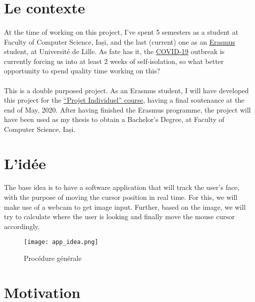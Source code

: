 \section{Le contexte}
\paragraph{}
At the time of working on this project, I've spent 5 semesters as a student at Faculty of Computer Science, Iași, and the last (current) one as an \href{https://ec.europa.eu/programmes/erasmus-plus/about_en}{Erasmus} student, at Université de Lille.
As fate has it, the \href{https://en.wikipedia.org/wiki/2019–20_coronavirus_pandemic}{COVID-19} outbreak is currently forcing us into at least 2 weeks of self-isolation, so what better opportunity to spend quality time working on this?
\paragraph{}
This is a double purposed project.
As an Erasmus student, I will have developed this project for the \href{https://www.fil.univ-lille1.fr/portail/index.php?dipl=MInfo&sem=S8&ue=PJI&label=Présentation}{``Projet Individuel'' course}, having a final soutenance at the end of May, 2020.
After having finished the Erasmus programme, the project will have been used as my thesis to obtain a Bachelor's Degree, at Faculty of Computer Science, Iași.

\section{L'idée}
\paragraph{}
The base idea is to have a software application that will track the user's face, with the purpose of moving the cursor position in real time.
For this, we will make use of a webcam to get image input.
Further, based on the image, we will try to calculate where the user is looking and finally move the mouse cursor accordingly.
\begin{figure}[H]
    \centering
    \texttt{[image: app\_idea.png]}
    \caption{Procédure générale}
\end{figure}

\section{Motivation}
